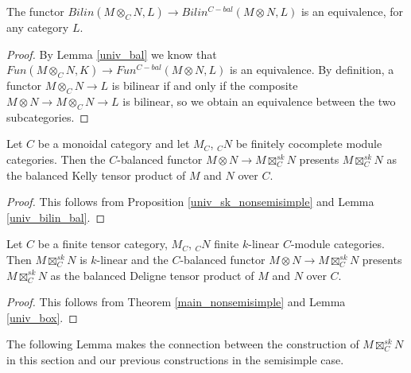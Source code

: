 \begin{lemma}\label{univ_bilin_bal}

  \noindent The functor $Bilin(M\otimes_C N,L)\to Bilin^{C-bal}(M\otimes N,
  L)$ is an equivalence, for any category $L$.
\end{lemma}

\begin{proof}
By Lemma \ref{univ_bal} we know that $Fun(M\otimes_C N,K)\to
Fun^{C-bal}(M\otimes N, L)$ is an equivalence. By definition, a functor
$M\otimes_C N\to L$ is bilinear if and only if the composite $M\otimes N\to
M\otimes_C N\to L$ is bilinear, so we obtain an equivalence between the two
subcategories.
\end{proof}

\begin{theorem}\label{main_nonsemisimple}

  \noindent Let $C$ be a monoidal category and let $M_C$, $_{C}N$ be finitely
  cocomplete module categories. Then the $C$-balanced functor $M\otimes N\to
  M\boxtimes_C^{sk}N$ presents $M\boxtimes_C^{sk}N$ as the balanced Kelly
  tensor product of $M$ and $N$ over $C$.
\end{theorem}

\begin{proof}

This follows from Proposition \ref{univ_sk_nonsemisimple} and Lemma
\ref{univ_bilin_bal}.
\end{proof}

\begin{corollary}

  \noindent Let $C$ be a finite tensor category, $M_C$, $_{C}N$ finite
  $k$-linear $C$-module categories. Then $M\boxtimes_C^{sk}N$ is $k$-linear
  and the $C$-balanced functor $M\otimes N\to M\boxtimes_C^{sk}N$ presents
  $M\boxtimes_C^{sk}N$ as the balanced Deligne tensor product of $M$ and $N$
  over $C$.
\end{corollary}

\begin{proof}
  This follows from Theorem \ref{main_nonsemisimple} and Lemma \ref{univ_box}.
\end{proof}

The following Lemma makes the connection between the construction of
$M\boxtimes_C^{sk}N$ in this section and our previous constructions in the
semisimple case.

%

